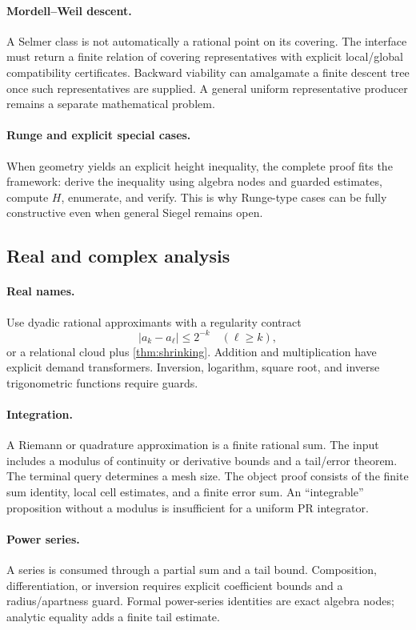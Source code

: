 \paragraph{Mordell--Weil descent.}
A Selmer class is not automatically a rational point on its covering.  The interface must return a finite relation of covering representatives with explicit local/global compatibility certificates.  Backward viability can amalgamate a finite descent tree once such representatives are supplied.  A general uniform representative producer remains a separate mathematical problem.

\paragraph{Runge and explicit special cases.}
When geometry yields an explicit height inequality, the complete proof fits the framework: derive the inequality using algebra nodes and guarded estimates, compute \(H\), enumerate, and verify.  This is why Runge-type cases can be fully constructive even when general Siegel remains open.

\subsection{Real and complex analysis}

\paragraph{Real names.}
Use dyadic rational approximants with a regularity contract
\[
 |a_k-a_\ell|\le2^{-k}\quad(\ell\ge k),
\]
or a relational cloud plus \cref{thm:shrinking}.  Addition and multiplication have explicit demand transformers.  Inversion, logarithm, square root, and inverse trigonometric functions require guards.

\paragraph{Integration.}
A Riemann or quadrature approximation is a finite rational sum.  The input includes a modulus of continuity or derivative bounds and a tail/error theorem.  The terminal query determines a mesh size.  The object proof consists of the finite sum identity, local cell estimates, and a finite error sum.  An ``integrable'' proposition without a modulus is insufficient for a uniform PR integrator.

\paragraph{Power series.}
A series is consumed through a partial sum and a tail bound.  Composition, differentiation, or inversion requires explicit coefficient bounds and a radius/apartness guard.  Formal power-series identities are exact algebra nodes; analytic equality adds a finite tail estimate.

